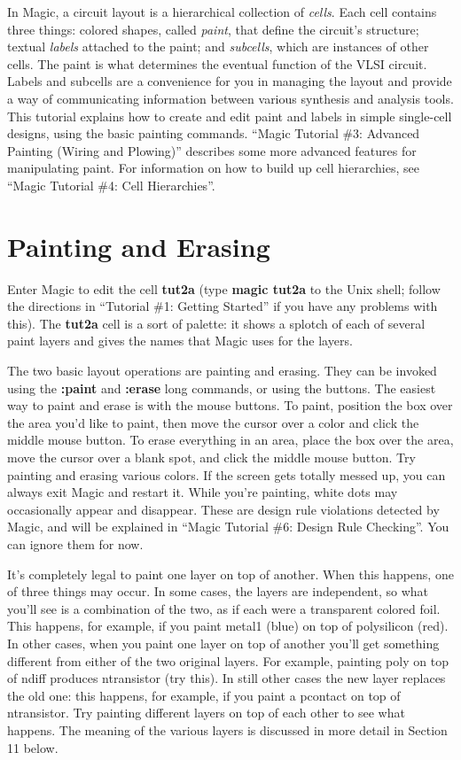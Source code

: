 \documentclass[letterpaper,twoside,12pt]{article}
\begin{document}
In Magic, a circuit layout is a hierarchical collection
of {\itshape cells}.  Each cell contains three things:
colored shapes, called {\itshape paint}, that define the circuit's structure;
textual {\itshape labels} attached to the paint;  and
{\itshape subcells}, which are instances of other cells.  The paint
is what determines the eventual function of the VLSI circuit.  Labels
and subcells are a convenience for you in managing
the layout and provide a way of communicating information
between various synthesis and analysis tools.  This tutorial
explains how to create and edit paint and labels in simple
single-cell designs, using the basic painting commands.
``Magic Tutorial  \#3: Advanced Painting (Wiring and Plowing)''
describes some more advanced features for manipulating paint.
For information on how to build up cell
hierarchies, see ``Magic Tutorial  \#4:  Cell Hierarchies''.

\section{Painting and Erasing}

Enter Magic to edit the cell {\bfseries tut2a} (type {\bfseries magic tut2a}
to the Unix shell;  follow the directions in ``Tutorial \#1: Getting
Started'' if you have any problems with this).  The {\bfseries tut2a}
cell is a sort of palette:  it shows a splotch of each of several
paint layers and gives the names that Magic uses for the layers.

The two basic layout operations are painting and erasing.  They
can be invoked using the {\bfseries :paint} and {\bfseries :erase}
long commands, or using the buttons.  The easiest way to paint
and erase is with the mouse buttons.  To paint, 
position the box over the area
you'd like to paint, then move the cursor over a color
and click the middle mouse button.  To erase
everything in an area, place the box over the area, move the
cursor over a blank spot, and click the middle mouse button.
Try painting and erasing various colors.  If the screen gets
totally messed up, you can always exit Magic and restart it.
While you're painting, white dots may occasionally appear
and disappear.  These are design rule violations detected
by Magic, and will be explained in ``Magic Tutorial \#6: Design
Rule Checking''.  You can ignore them for now.

It's completely legal to paint one layer on top of another.
When this happens, one of three things may occur.  In some
cases, the layers are independent, so what you'll see is
a combination of the two, as if each were a transparent colored
foil.  This happens, for example, if you paint metal1 (blue) on
top of polysilicon (red).  In other cases, when you paint one
layer on top of another you'll get something different from
either of the two original layers.  For example, painting
poly on top of ndiff produces ntransistor (try
this).  In still other cases the
new layer replaces the old one:  this happens, for example,
if you paint a pcontact on top of ntransistor.
Try painting different layers on top of each other to see
what happens.  The meaning of the various layers is discussed
in more detail in Section 11 below.
\end{document}
